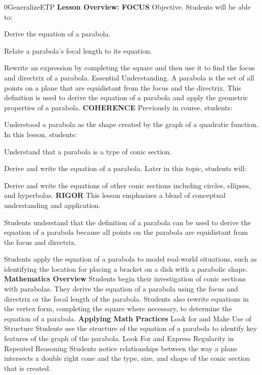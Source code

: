 \documentclass{article}
\newenvironment{te-addendum}[2]{}{}     %
\newcommand{\te}[1]{}                   %
\begin{document}
\begin{te-addendum}{0}{GeneralizeETP}
\textbf{Lesson Overview: FOCUS}
Objective. Students will be able to:
\item Derive the equation of a parabola.
\item Relate a parabola's focal length to its equation.
\item Rewrite an expression by completing the square and then use it to find the focus and directrix of a parabola.
Essential Understanding. A parabola is the set of all points on a plane that are equidistant from the focus and the directrix. This definition is used to derive the equation of a parabola and apply the geometric properties of a parabola.
\textbf{COHERENCE}
Previously in course, students:
\item Understood a parabola as the shape created by the graph of a quadratic function.
In this lesson, students:
\item Understand that a parabola is a type of conic section.
\item Derive and write the equation of a parabola.
Later in this topic, students will:
\item Derive and write the equations of other conic sections including circles, ellipses, and hyperbolas.
\textbf{RIGOR}
This lesson emphasizes a blend of conceptual understanding and application.
\item Students understand that the definition of a parabola can be used to derive the equation of a parabola because all points on the parabola are equidistant from the focus and directrix.
\item Students apply the equation of a parabola to model real-world situations, such as identifying the location for placing a bracket on a dish with a parabolic shape.
\textbf{Mathematics Overview}
Students begin their investigation of conic sections with parabolas. They derive the equation of a parabola using the focus and directrix or the focal length of the parabola. Students also rewrite equations in the vertex form, completing the square where necessary, to determine the equation of a parabola.
\textbf{Applying Math Practices}
Look for and Make Use of Structure
Students use the structure of the equation of a parabola to identify key features of the graph of the parabola.
Look For and Express Regularity in Repeated Reasoning
Students notice relationships between the way a plane intersects a double right cone and the type, size, and shape of the conic section that is created.
\te{Program Resources. SavvasRealize.com.}
\end{te-addendum}
\end{document}
